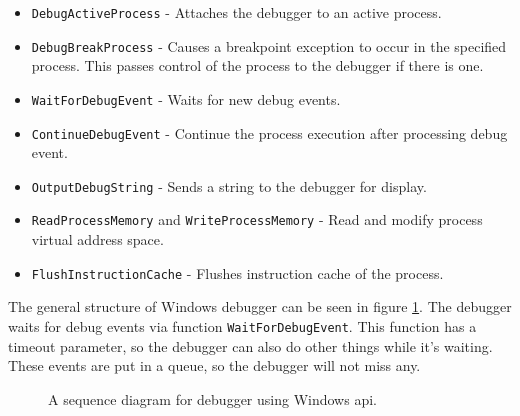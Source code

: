 \begin{itemize}
    \item \texttt{DebugActiveProcess} - Attaches the debugger to an active process.
    \item \texttt{DebugBreakProcess} - Causes a breakpoint exception to occur in the specified process. 
                                          This passes control of the process to the debugger if there is one.
    \item \texttt{WaitForDebugEvent} - Waits for new debug events.
    \item \texttt{ContinueDebugEvent} - Continue the process execution after processing debug event.
    \item \texttt{OutputDebugString} - Sends a string to the debugger for display.
    \item \texttt{ReadProcessMemory} and \texttt{WriteProcessMemory} - Read and modify process virtual address space.
    \item \texttt{FlushInstructionCache} - Flushes instruction cache of the process.
\end{itemize}

The general structure of Windows debugger can be seen in figure \ref{fig:win32debugger}.
The debugger waits for debug events via function \texttt{WaitForDebugEvent}.
This function has a timeout parameter, so the debugger can also do other things while it's waiting.
These events are put in a queue, so the debugger will not miss any.

\begin{figure}
    \centering
    \caption{A sequence diagram for debugger using Windows api.}
    \label{fig:win32debugger}
\end{figure}

